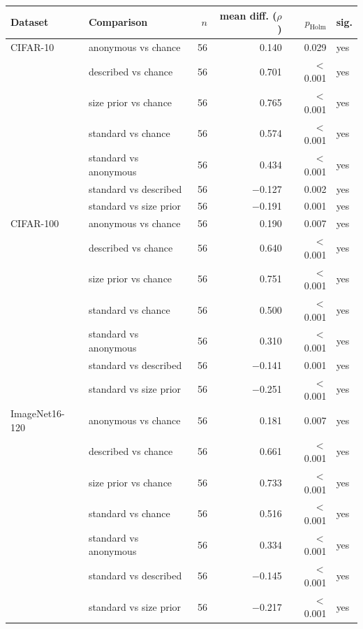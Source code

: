 \begin{tabular}{@{}llrrrl@{}}
\toprule
Dataset & Comparison & $n$ & mean diff. ($\rho$) & $p_{\mathrm{Holm}}$ & sig.\\
\midrule
CIFAR-10 & anonymous vs chance & 56 & 0.140 & 0.029 & yes\\
 & described vs chance & 56 & 0.701 & $<$0.001 & yes\\
 & size prior vs chance & 56 & 0.765 & $<$0.001 & yes\\
 & standard vs chance & 56 & 0.574 & $<$0.001 & yes\\
 & standard vs anonymous & 56 & 0.434 & $<$0.001 & yes\\
 & standard vs described & 56 & $-$0.127 & 0.002 & yes\\
 & standard vs size prior & 56 & $-$0.191 & 0.001 & yes\\
\midrule
CIFAR-100 & anonymous vs chance & 56 & 0.190 & 0.007 & yes\\
 & described vs chance & 56 & 0.640 & $<$0.001 & yes\\
 & size prior vs chance & 56 & 0.751 & $<$0.001 & yes\\
 & standard vs chance & 56 & 0.500 & $<$0.001 & yes\\
 & standard vs anonymous & 56 & 0.310 & $<$0.001 & yes\\
 & standard vs described & 56 & $-$0.141 & 0.001 & yes\\
 & standard vs size prior & 56 & $-$0.251 & $<$0.001 & yes\\
\midrule
ImageNet16-120 & anonymous vs chance & 56 & 0.181 & 0.007 & yes\\
 & described vs chance & 56 & 0.661 & $<$0.001 & yes\\
 & size prior vs chance & 56 & 0.733 & $<$0.001 & yes\\
 & standard vs chance & 56 & 0.516 & $<$0.001 & yes\\
 & standard vs anonymous & 56 & 0.334 & $<$0.001 & yes\\
 & standard vs described & 56 & $-$0.145 & $<$0.001 & yes\\
 & standard vs size prior & 56 & $-$0.217 & $<$0.001 & yes\\
\bottomrule
\end{tabular}
